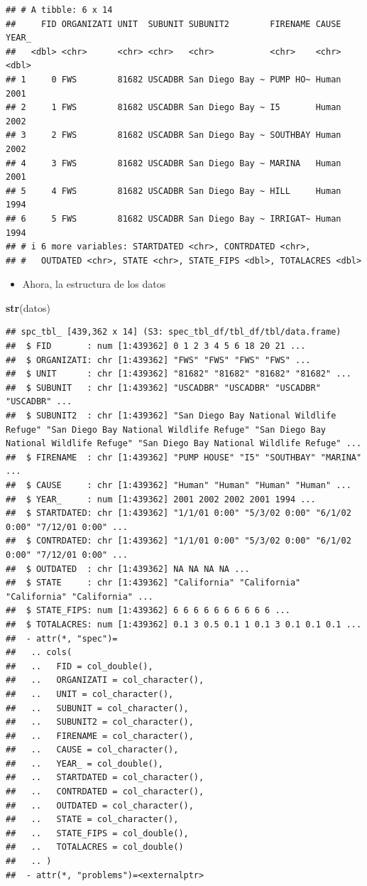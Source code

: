 \documentclass[
]{book}
\newenvironment{Shaded}{\begin{snugshade}}{\end{snugshade}}
\newcommand{\FunctionTok}[1]{\textcolor[rgb]{0.13,0.29,0.53}{\textbf{#1}}}
\newcommand{\NormalTok}[1]{#1}
\providecommand{\tightlist}{%
  \setlength{\itemsep}{0pt}\setlength{\parskip}{0pt}}
\begin{document}
\begin{verbatim}
## # A tibble: 6 x 14
##     FID ORGANIZATI UNIT  SUBUNIT SUBUNIT2        FIRENAME CAUSE YEAR_
##   <dbl> <chr>      <chr> <chr>   <chr>           <chr>    <chr> <dbl>
## 1     0 FWS        81682 USCADBR San Diego Bay ~ PUMP HO~ Human  2001
## 2     1 FWS        81682 USCADBR San Diego Bay ~ I5       Human  2002
## 3     2 FWS        81682 USCADBR San Diego Bay ~ SOUTHBAY Human  2002
## 4     3 FWS        81682 USCADBR San Diego Bay ~ MARINA   Human  2001
## 5     4 FWS        81682 USCADBR San Diego Bay ~ HILL     Human  1994
## 6     5 FWS        81682 USCADBR San Diego Bay ~ IRRIGAT~ Human  1994
## # i 6 more variables: STARTDATED <chr>, CONTRDATED <chr>,
## #   OUTDATED <chr>, STATE <chr>, STATE_FIPS <dbl>, TOTALACRES <dbl>
\end{verbatim}

\begin{itemize}
\tightlist
\item
  Ahora, la estructura de los datos
\end{itemize}

\begin{Shaded}
\begin{Highlighting}[]
\FunctionTok{str}\NormalTok{(datos)}
\end{Highlighting}
\end{Shaded}

\begin{verbatim}
## spc_tbl_ [439,362 x 14] (S3: spec_tbl_df/tbl_df/tbl/data.frame)
##  $ FID       : num [1:439362] 0 1 2 3 4 5 6 18 20 21 ...
##  $ ORGANIZATI: chr [1:439362] "FWS" "FWS" "FWS" "FWS" ...
##  $ UNIT      : chr [1:439362] "81682" "81682" "81682" "81682" ...
##  $ SUBUNIT   : chr [1:439362] "USCADBR" "USCADBR" "USCADBR" "USCADBR" ...
##  $ SUBUNIT2  : chr [1:439362] "San Diego Bay National Wildlife Refuge" "San Diego Bay National Wildlife Refuge" "San Diego Bay National Wildlife Refuge" "San Diego Bay National Wildlife Refuge" ...
##  $ FIRENAME  : chr [1:439362] "PUMP HOUSE" "I5" "SOUTHBAY" "MARINA" ...
##  $ CAUSE     : chr [1:439362] "Human" "Human" "Human" "Human" ...
##  $ YEAR_     : num [1:439362] 2001 2002 2002 2001 1994 ...
##  $ STARTDATED: chr [1:439362] "1/1/01 0:00" "5/3/02 0:00" "6/1/02 0:00" "7/12/01 0:00" ...
##  $ CONTRDATED: chr [1:439362] "1/1/01 0:00" "5/3/02 0:00" "6/1/02 0:00" "7/12/01 0:00" ...
##  $ OUTDATED  : chr [1:439362] NA NA NA NA ...
##  $ STATE     : chr [1:439362] "California" "California" "California" "California" ...
##  $ STATE_FIPS: num [1:439362] 6 6 6 6 6 6 6 6 6 6 ...
##  $ TOTALACRES: num [1:439362] 0.1 3 0.5 0.1 1 0.1 3 0.1 0.1 0.1 ...
##  - attr(*, "spec")=
##   .. cols(
##   ..   FID = col_double(),
##   ..   ORGANIZATI = col_character(),
##   ..   UNIT = col_character(),
##   ..   SUBUNIT = col_character(),
##   ..   SUBUNIT2 = col_character(),
##   ..   FIRENAME = col_character(),
##   ..   CAUSE = col_character(),
##   ..   YEAR_ = col_double(),
##   ..   STARTDATED = col_character(),
##   ..   CONTRDATED = col_character(),
##   ..   OUTDATED = col_character(),
##   ..   STATE = col_character(),
##   ..   STATE_FIPS = col_double(),
##   ..   TOTALACRES = col_double()
##   .. )
##  - attr(*, "problems")=<externalptr>
\end{verbatim}
\end{document}
